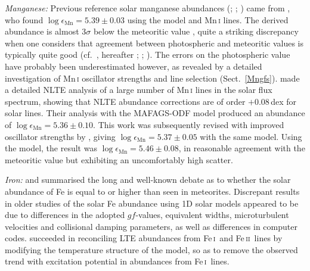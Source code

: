 \documentclass[traditabstract]{aa}
\newcommand{\altfei}{Fe\,\textsc{i}}
\newcommand{\altfeii}{Fe\,\textsc{ii}}
\newcommand{\fei}{\altfei\ }
\newcommand{\feii}{\altfeii\ }
\begin{document}
\textit{Manganese:} Previous reference solar manganese abundances (; ; \citealt{Grevesse07})
came from \citet{Booth84b}, who found $\log \epsilon_\mathrm{Mn}=5.39\pm0.03$ using the  model
and Mn\,\textsc{i} lines.  The derived abundance is almost 3$\sigma$ below the meteoritic value \citep{Lodders09}, quite a striking
discrepancy when one considers that agreement between photospheric and meteoritic values is typically quite good
 (cf.~\citealt{AG89}, hereafter ; ; \citealt{Lodders09}).  The errors on the photospheric value have probably been
underestimated however, as revealed by a detailed investigation of Mn\,\textsc{i} oscillator strengths and line
selection (Sect.~\ref{Mngfs}).  \citet{Bergemann07}  made a detailed NLTE analysis of a large number
of Mn\,\textsc{i} lines in the solar flux spectrum, showing that NLTE abundance corrections are of order $+0.08$\,dex
for solar lines.  Their analysis with the MAFAGS-ODF model produced an abundance of
$\log \epsilon_\mathrm{Mn}=5.36\pm0.10$.  This work was subsequently revised with improved oscillator strengths by
\citet{BW07}, giving $\log \epsilon_\mathrm{Mn}=5.37\pm0.05$ with the same model.  Using the  model,
the result was $\log \epsilon_\mathrm{Mn}=5.46\pm0.08$, in reasonable agreement with the meteoritic value but exhibiting an
uncomfortably high scatter.

\textit{Iron:} \citet{GS99} and \citet{AspII} summarised the long and well-known debate as to whether the solar abundance of Fe is equal to or higher than seen in meteorites.  Discrepant results in older studies of the solar Fe abundance using 1D solar models appeared to be due to differences in the adopted $gf$-values, equivalent widths, microturbulent velocities and collisional damping parameters, as well as differences in computer codes. \citet{GS99} succeeded in reconciling LTE abundances from \fei and \feii lines by modifying the temperature structure of the  model, so as to remove the observed trend with excitation potential in abundances from \fei lines. 
\end{document}
